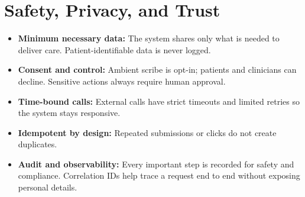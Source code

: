 \documentclass[11pt]{article}
\begin{document}
\section*{Safety, Privacy, and Trust}
\begin{itemize}
  \item \textbf{Minimum necessary data:} The system shares only what is needed to deliver care. Patient-identifiable data is never logged.
  \item \textbf{Consent and control:} Ambient scribe is opt-in; patients and clinicians can decline. Sensitive actions always require human approval.
  \item \textbf{Time-bound calls:} External calls have strict timeouts and limited retries so the system stays responsive.
  \item \textbf{Idempotent by design:} Repeated submissions or clicks do not create duplicates.
  \item \textbf{Audit and observability:} Every important step is recorded for safety and compliance. Correlation IDs help trace a request end to end without exposing personal details.
\end{itemize}
\end{document}
